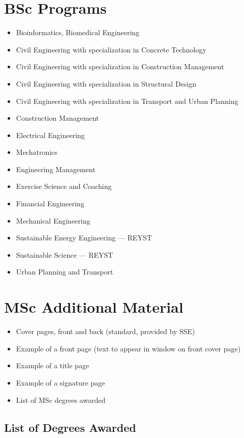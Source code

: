 \section{BSc Programs}
\begin{itemize}
\item Bioinformatics, Biomedical Engineering
\item Civil Engineering with specialization in Concrete Technology
\item Civil Engineering with specialization in Construction Management
\item Civil Engineering with specialization in Structural Design
\item Civil Engineering with specialization in Transport and Urban Planning
\item Construction Management
\item Electrical Engineering
\item Mechatronics
\item Engineering Management
\item Exercise Science and Coaching
\item Financial Engineering
\item Mechanical Engineering
\item Sustainable Energy Engineering --- REYST
\item Sustainable Science --- REYST
\item Urban Planning and Transport              
\end{itemize}

\section{MSc Additional Material}
\begin{itemize}
\item Cover pages, front and back (standard, provided by SSE)
\item Example of a front page (text to appear in window on front cover page)
\item Example of a title page
\item Example of a signature page
\item List of MSc degrees awarded
\end{itemize}

\subsection{List of Degrees Awarded}

